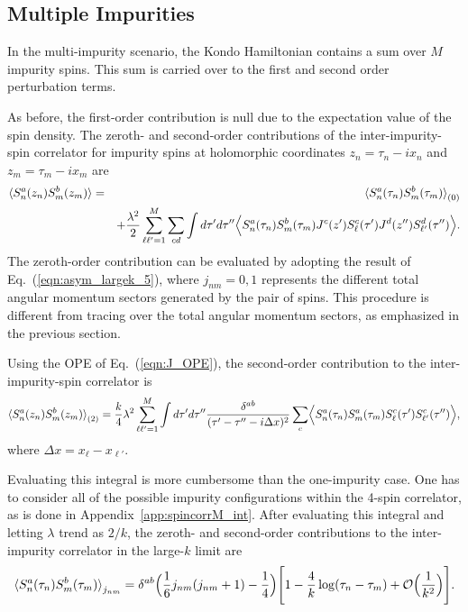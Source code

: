 \documentclass[aps,prb,twocolumn,superscriptaddress]{revtex4-1}
\begin{document}
\subsection{Multiple Impurities}
\label{se:multipleimp}
In the multi-impurity scenario, the Kondo Hamiltonian contains a sum over $M$ impurity spins. This sum is carried over to the first and second order perturbation terms. 
\begin{widetext}
As before, the first-order contribution is null due to the expectation value of the spin density. The zeroth- and second-order contributions of the inter-impurity-spin correlator for impurity spins at holomorphic coordinates $z_{n}=\tau_{n}-ix_{n}$ and $z_{m}=\tau_{m}-ix_{m}$ are
\begin{eqnarray}
\braket{S^{a}_{n}(z_{n})S^{b}_{m}(z_{m})}&=&\braket{S^{a}_{n}(\tau_{n})S^{b}_{m}(\tau_{m})}_{(0)} \label{eqn:Ispin_corr_M} \\
&&+\frac{\lambda^{2}}{2}\sum_{\ell\ell'=1}^{M}\sum_{cd}\int d\tau'd\tau''\Bigl\langle{S^{a}_{n}(\tau_{n})S^{b}_{m}(\tau_{m})J^{c}(z')S^{c}_{\ell}(\tau')J^{d}(z'')S^{d}_{\ell'}(\tau'')\Bigr\rangle}. \nonumber 
\end{eqnarray}
The zeroth-order contribution can be evaluated by adopting the result of Eq.~(\ref{eqn:asym_largek_5}), where $j_{nm}=0,1$ represents the different total angular momentum sectors generated by the pair of spins. This procedure is different from tracing over the total angular momentum sectors, as emphasized in the previous section. 

Using the OPE of Eq.~(\ref{eqn:J_OPE}), the second-order contribution to the inter-impurity-spin correlator is
\begin{eqnarray}
\braket{S^{a}_{n}(z_{n})S^{b}_{m}(z_{m})}_{(2)}=\frac{k}{4}\lambda^{2}\sum_{\ell\ell'=1}^{M}\int d\tau'd\tau''\frac{\delta^{ab}}{(\tau'-\tau''-i\Delta{x})^{2}}\sum_{c}\Bigl\langle{S^{a}_{n}(\tau_{n})S^{a}_{m}(\tau_{m})S^{c}_{\ell}(\tau')S^{c}_{\ell'}(\tau'')\Bigr\rangle}, \label{eqn:2orderM_1}
\end{eqnarray}
where $\Delta{x}=x_{\ell}-x_{\ell'}$. 

Evaluating this integral is more cumbersome than the one-impurity case. One has to consider all of the possible impurity configurations within the 4-spin correlator, as is done in Appendix~\ref{app:spincorrM_int}. After evaluating this integral and letting $\lambda$ trend as $2/k$, the zeroth- and second-order contributions to the inter-impurity correlator in the large-$k$ limit are
\begin{eqnarray}
\braket{S^{a}_{n}(\tau_{n})S^{b}_{m}(\tau_{m})}_{j_{nm}}=\delta^{ab}\Bigl(\frac{1}{6}j_{nm}(j_{nm}+1)-\frac{1}{4}\Bigr)\Biggl[1-\frac{4}{k}\log(\tau_{n}-\tau_{m})+\mathcal{O}\Bigl(\frac{1}{k^{2}}\Bigr)\Biggr]. \label{eqn:Ispin_corrM}
\end{eqnarray}
\end{widetext}
\end{document}
